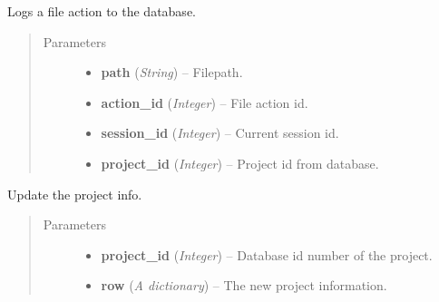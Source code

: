 \documentclass[letterpaper,10pt,english]{sphinxmanual}
\begin{document}

\begin{fulllineitems}
\label{controller:controller.project.create_file_action}
Logs a file action to the database.
\begin{quote}\begin{description}
\item[{Parameters}] \leavevmode\begin{itemize}
\item {} 
\textbf{path} (\emph{String}) -- Filepath.

\item {} 
\textbf{action\_id} (\emph{Integer}) -- File action id.

\item {} 
\textbf{session\_id} (\emph{Integer}) -- Current session id.

\item {} 
\textbf{project\_id} (\emph{Integer}) -- Project id from database.

\end{itemize}

\end{description}\end{quote}

\end{fulllineitems}


\begin{fulllineitems}
\label{controller:controller.project.edit_project}
Update the project info.
\begin{quote}\begin{description}
\item[{Parameters}] \leavevmode\begin{itemize}
\item {} 
\textbf{project\_id} (\emph{Integer}) -- Database id number of the project.

\item {} 
\textbf{row} (\emph{A dictionary}) -- The new project information.

\end{itemize}

\end{description}\end{quote}

\end{fulllineitems}
\end{document}
